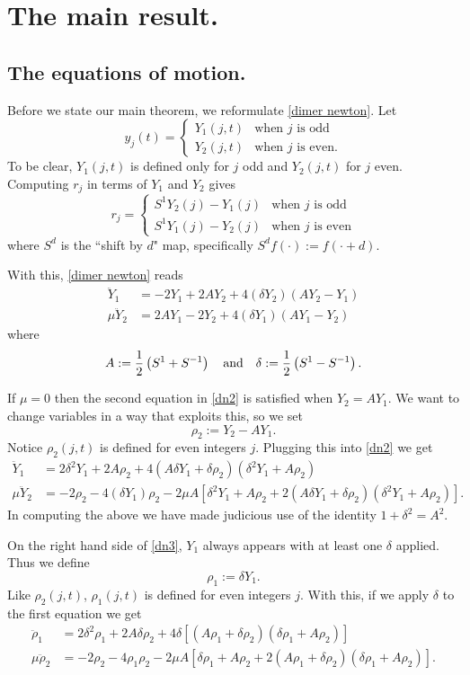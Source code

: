 \documentclass[12pt]{amsart}
\numberwithin{equation}{section}
\newcommand{\be}{\begin{equation}}
\newcommand{\ee}{\end{equation}}
\newcommand{\bes}{\begin{equation*}}
\newcommand{\ees}{\end{equation*}}
\newcommand{\mand}{\quad \text{and}\quad}
\begin{document}
\section{The main result.}\label{equation of motion}
\subsection{The equations of motion.}
Before we state our main theorem, we reformulate \eqref{dimer newton}.
Let
\be\label{ansatz}
y_j(t) = \begin{cases}Y_{1}(j,t) &\text{when $j$ is odd} \\ Y_2(j,t) &\text{when $j$ is even.} \end{cases}
\ee
To be clear, $Y_1(j,t)$ is defined only for $j$ odd and $Y_2(j,t)$ for $j$ even. Computing $r_j$ in terms of $Y_1$ and $Y_2$ gives 
$$
r_j = \begin{cases}S^1 Y_2(j)-Y_1(j) &\text{when $j$ is odd} \\ S^1 Y_1(j)-Y_2(j) &\text{when $j$ is even} \end{cases}
$$
where $S^d$ is the ``shift by $d$" map, specifically $S^d f( \cdot)  := f(\cdot + d)$.

With this,  \eqref{dimer newton} reads
\be\begin{split}\label{dn2}
 \ddot{Y}_1 & = -2 Y_1 + 2A Y_2  +4(\delta Y_2) ( A Y_2 - Y_1)\\
\mu \ddot{Y}_2 & = 2 A Y_1 - 2Y_2  + 4(\delta Y_1) ( A Y_1 - Y_2)
\end{split}\ee
where
\be\label{Ad}
A :={1 \over 2} \left(S^{1} + S^{-1}\right) \mand
\delta :={1 \over 2} \left(S^1 -S^{-1}\right).
\ee


If $\mu = 0$ then the second equation in \eqref{dn2} is satisfied when $Y_2 = AY_1$.
We want to change variables in a way that exploits this, so we set
$$
\rho_2 := Y_2 - AY_1.
$$
Notice $\rho_2(j,t)$ is defined for even integers $j$.
Plugging this into \eqref{dn2} we get
\be\begin{split}\label{dn3}
 \ddot{Y}_1 & = 2 \delta^2 Y_1 + 2A \rho_2  +4(A \delta Y_1  + \delta \rho_2) ( \delta^2 Y_1 + A\rho_2)\\
\mu \ddot{Y}_2 & = -2 \rho_2 - 4(\delta Y_1) \rho_2 - 2\mu A\left[\delta^2 Y_1 + A\rho_2+2(A \delta Y_1 + \delta \rho_2)
(\delta^2 Y_1 + A\rho_2)\right].
\end{split}\ee
In computing the above we have made judicious use of the identity $1+\delta^2 = A^2$.

On the right hand side of \eqref{dn3}, $Y_1$ always appears with at least one $\delta$ applied.
Thus we define $$\rho_1:=\delta Y_1.$$  Like $\rho_2(j,t)$, $\rho_1(j,t)$ is defined for even integers $j$.
With this, if we apply $\delta$ to the first equation we get
\bes\begin{split}
  \ddot{\rho}_1 & = 2 \delta^2 \rho_1 + 2A\delta \rho_2  + 4\delta[(A \rho_1 + \delta \rho_2) ( \delta \rho_1 + A\rho_2)]\\
\mu \ddot {\rho}_2 & = -2\rho_2 - 4 \rho_1 \rho_2 -2\mu A[ \delta \rho_1 + A\rho_2  + 2(A \rho_1 + \delta \rho_2) ( \delta \rho_1 + A\rho_2)].
\end{split}\ees
\end{document}
